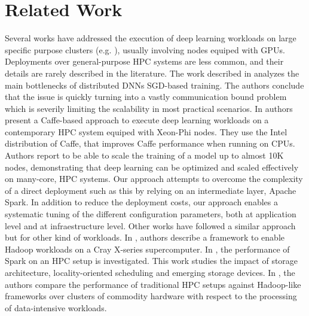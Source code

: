 \documentclass[journal]{IEEEtran}
\begin{document}


\section{Related Work}
\label{sec:rw}

Several works have addressed the execution of deep learning workloads on large specific purpose clusters (e.g. \cite{DBLP:journals/corr/abs-1708-02983}), usually involving nodes equiped with GPUs. Deployments over general-purpose HPC systems are less common, and their details are rarely described in the literature. The work described in \cite{DBLP:conf/sc/KeuperP16} analyzes the main bottlenecks of distributed DNNs SGD-based training. The authors conclude that the issue is quickly turning into a vastly communication bound problem which is severily limiting the scalability in most practical scenarios. In \cite{DBLP:journals/corr/abs-1708-05256} authors present a Caffe-based approach to execute deep learning workloads on a contemporary HPC system equiped with Xeon-Phi nodes. They use the Intel distribution of Caffe, that improves Caffe performance when running on CPUs. Authors report to be able to scale the training of a model up to almost 10K nodes, demonstrating that deep learning can be optimized and scaled effectively on many-core, HPC systems. Our approach attempts to overcome the complexity of a direct deployment such as this by relying on an intermediate layer, Apache Spark. In addition to reduce the deployment costs, our approach enables a systematic tuning of the different configuration parameters, both at application level and at infraestructure level. Other works have followed a similar approach but for other kind of workloads. In \cite{michael2014}, authors describe a framework to enable Hadoop workloads on a Cray X-series supercomputer. In \cite{wang2014}, the performance of Spark on an HPC setup is investigated. This work studies the impact of storage architecture, locality-oriented scheduling and emerging storage devices. In \cite{jha2014}, the authors compare the performance of traditional HPC setups against Hadoop-like frameworks over clusters of commodity hardware with respect to the processing of data-intensive workloads. 


\end{document}
